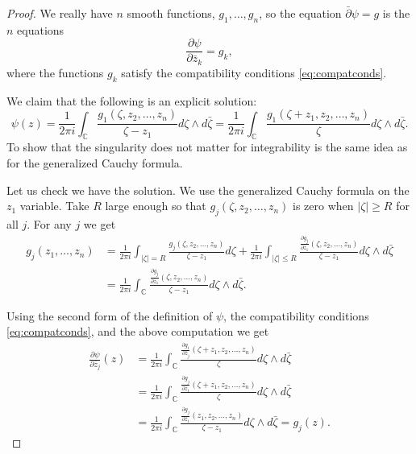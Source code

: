 \documentclass[12pt,openany]{book}
\newcommand{\sabs}[1]{\lvert {#1} \rvert}
\newcommand{\abs}[1]{\left\lvert {#1} \right\rvert}
\newcommand{\C}{{\mathbb{C}}}
\theoremstyle{plain}
\theoremstyle{remark}
\theoremstyle{definition}
\theoremstyle{exercise}
\theoremstyle{example}
\begin{document}
\begin{proof}
We really have $n$ 
smooth functions, $g_1,\ldots,g_n$, so the equation $\bar{\partial} \psi = g$
is the $n$ equations
\begin{equation*}
\frac{\partial \psi}{\partial \bar{z}_k} = g_k ,
\end{equation*}
where the functions $g_k$ satisfy the compatibility conditions
\eqref{eq:compatconds}.

We claim that the following is an explicit solution:
\begin{equation*}
\psi(z)
=
\frac{1}{2\pi i}
\int_\C
\frac{
 g_1(\zeta,z_2,\ldots,z_n)
}{\zeta - z_1}
d\zeta \wedge d\bar{\zeta}
=
\frac{1}{2\pi i}
\int_\C
\frac{
 g_1(\zeta+z_1,z_2,\ldots,z_n)
}{\zeta}
d\zeta \wedge d\bar{\zeta} .
\end{equation*}
To show that the singularity does not matter for integrability is the same
idea as for the generalized Cauchy formula.

Let us check we have the solution.
We use the generalized Cauchy formula on the $z_1$
variable.
Take $R$ large enough so that 
$g_j(\zeta,z_2,\ldots,z_n)$ is zero when $\sabs{\zeta}\geq R$ for all $j$.
For any $j$ we get
\begin{equation*}
\begin{split}
g_j(z_1,\ldots,z_n) & =
\frac{1}{2\pi i}
\int_{\abs{\zeta}=R}
\frac{g_j(\zeta,z_2,\ldots,z_n)}{\zeta-z_1}
d \zeta
+
\frac{1}{2\pi i}
\int_{\abs{\zeta} \leq R}
\frac{\frac{\partial g_j}{\partial \bar{z}_1}(\zeta,z_2,\ldots,z_n)}{\zeta-z_1}
d\zeta \wedge d\bar{\zeta} 
\\
& =
\frac{1}{2\pi i}
\int_{\C}
\frac{\frac{\partial g_j}{\partial \bar{z}_1}(\zeta,z_2,\ldots,z_n)}{\zeta-z_1}
d\zeta \wedge d\bar{\zeta}  .
\end{split}
\end{equation*}

Using the second form of the definition of $\psi$, the
compatibility conditions \eqref{eq:compatconds}, and the above computation we get
\begin{equation*} 
\begin{split}
\frac{\partial\psi}{\partial \bar{z}_j}(z)
& =
\frac{1}{2\pi i}
\int_\C
\frac{
 \frac{\partial g_1}{\partial \bar{z}_j}(\zeta+z_1,z_2,\ldots,z_n)
}{\zeta}
d\zeta \wedge d\bar{\zeta} 
\\
& =
\frac{1}{2\pi i}
\int_\C
\frac{
 \frac{\partial g_j}{\partial \bar{z}_1}(\zeta+z_1,z_2,\ldots,z_n)
}{\zeta}
d\zeta \wedge d\bar{\zeta} 
\\
& =
\frac{1}{2\pi i}
\int_\C
\frac{
 \frac{\partial g_j}{\partial \bar{z}_1}(z_1,z_2,\ldots,z_n)
}{\zeta-z_1}
d\zeta \wedge d\bar{\zeta} 
=
g_j(z) .
\end{split}
\end{equation*}


\end{proof}
\end{document}

